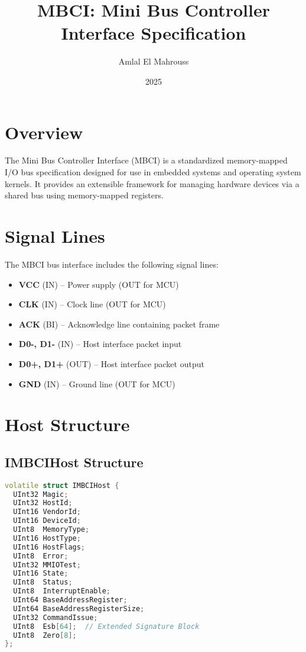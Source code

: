 \documentclass{article}
\title{MBCI: Mini Bus Controller Interface Specification}
\author{Amlal El Mahrouss}
\date{2025}
\begin{document}
\maketitle

\section{Overview}
The Mini Bus Controller Interface (MBCI) is a standardized memory-mapped I/O bus specification designed for use in embedded systems and operating system kernels. It provides an extensible framework for managing hardware devices via a shared bus using memory-mapped registers.

\section{Signal Lines}
The MBCI bus interface includes the following signal lines:

\begin{itemize}
  \item \textbf{VCC} (IN) – Power supply (OUT for MCU)
  \item \textbf{CLK} (IN) – Clock line (OUT for MCU)
  \item \textbf{ACK} (BI) – Acknowledge line containing packet frame
  \item \textbf{D0-, D1-} (IN) – Host interface packet input
  \item \textbf{D0+, D1+} (OUT) – Host interface packet output
  \item \textbf{GND} (IN) – Ground line (OUT for MCU)
\end{itemize}

\section{Host Structure}

\subsection*{IMBCIHost Structure}

\begin{lstlisting}[language=C++,basicstyle=\ttfamily\footnotesize]
volatile struct IMBCIHost {
  UInt32 Magic;
  UInt32 HostId;
  UInt16 VendorId;
  UInt16 DeviceId;
  UInt8  MemoryType;
  UInt16 HostType;
  UInt16 HostFlags;
  UInt8  Error;
  UInt32 MMIOTest;
  UInt16 State;
  UInt8  Status;
  UInt8  InterruptEnable;
  UInt64 BaseAddressRegister;
  UInt64 BaseAddressRegisterSize;
  UInt32 CommandIssue;
  UInt8  Esb[64];  // Extended Signature Block
  UInt8  Zero[8];
};
\end{lstlisting}
\end{document}
